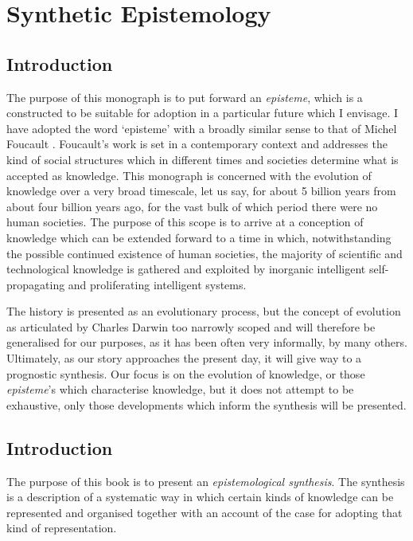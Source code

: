 \documentclass[10pt,titlepage]{book}
\begin{document}
\part{Synthetic Epistemology}


\appendix


\chapter{Introduction}

The purpose of this monograph is to put forward an \emph{episteme}, which is a constructed to be suitable for adoption in a particular future which I envisage.
I have adopted the word `episteme' with a broadly similar sense to that of  Michel Foucault \cite{foucault1966order}.
  Foucault's work is set in a contemporary context and addresses the kind of social structures which in different times and societies determine what is accepted as knowledge.
  This monograph is concerned with the evolution of knowledge over a very broad timescale, let us say, for about 5 billion years from about four billion years ago, for the vast bulk of which period there were no human societies.
  The purpose of this scope is to arrive at a conception of knowledge which can be extended forward to a time in which, notwithstanding the possible continued existence of human societies, the majority of scientific and technological knowledge is gathered and exploited by inorganic intelligent self-propagating and proliferating intelligent systems.

  The history is presented as an evolutionary process, but the concept of evolution as articulated by Charles Darwin \cite{darwin-oos} too narrowly scoped and will therefore be generalised for our purposes, as it has been often very informally, by many others.
  Ultimately, as our story approaches the present day, it will give way to a prognostic synthesis.
  Our focus is on the evolution of knowledge, or those \emph{episteme}'s which characterise knowledge, but it does not attempt to be exhaustive, only those developments which inform the synthesis will be presented.

\chapter{Introduction}

The purpose of this book is to present an \emph{epistemological synthesis}.
The synthesis is a description of a systematic way in which certain kinds of knowledge can be represented and organised together with an account of the case for adopting that kind of representation.
\end{document}
